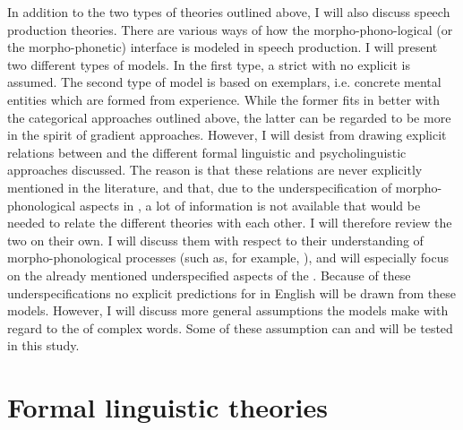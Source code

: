 In addition to the two types of theories outlined above, I will also discuss speech production theories. There are various ways of how the morpho-phono-logical (or the morpho-phonetic) interface is modeled in speech production.  
I will present two different types of models. In the first type, a strict  with no explicit  is assumed. The second type of model is based on exemplars, i.e. concrete mental entities which are formed from experience. While the former fits in better with the categorical approaches outlined above, the latter can be regarded to be more in the spirit of gradient approaches. 
However, I will desist from drawing explicit relations between  and the different formal linguistic and psycholinguistic approaches discussed. The reason is that these relations are never explicitly mentioned in the literature, and that, due to the underspecification of morpho-phonological aspects in , a lot of information is not available that would be needed to relate the different theories with each other.
I will therefore review the two  on their own. I will discuss them with respect to their understanding of morpho-phonological processes (such as, for example, ), and will especially focus on the already mentioned underspecified aspects of the .  Because of these underspecifications no explicit predictions for  in English  will be drawn from these models. However, I will discuss more general assumptions the models make with regard to the  of complex words. Some of these assumption can and will be tested in this study.



\section{Formal linguistic theories} 

